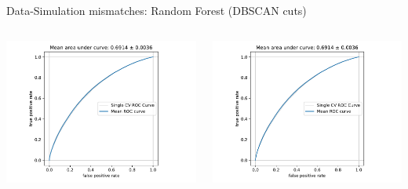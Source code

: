\begin{frame}[t]{Data-Simulation mismatches: Random Forest (DBSCAN cuts)}
\begin{columns}[onlytextwidth]
    \begin{column}{0.5\textwidth}
        \includegraphics[width=\textwidth,page=1]{fig/data_mc_separation_DBSCAN_cuts.pdf}
    \end{column}
    \begin{column}{0.5\textwidth}
        \includegraphics[width=\textwidth,page=2]{fig/data_mc_separation_DBSCAN_cuts.pdf}
    \end{column}
\end{columns}
\end{frame}

